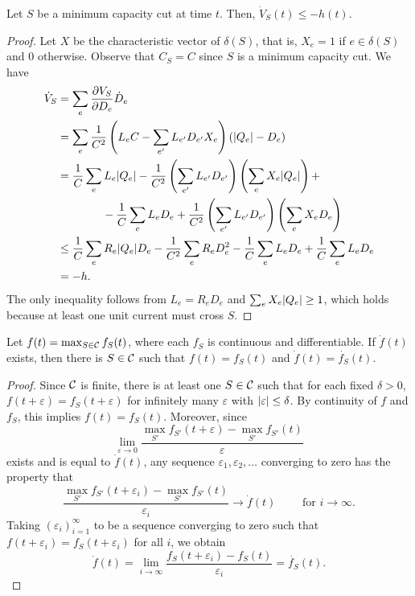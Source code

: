 \documentclass[11pt,a4paper]{article}
\begin{document}
\begin{lemma}
\label{lem:equality}
Let $S$ be a minimum capacity cut at time $t$. Then, $\dot{V}_S(t) \le -h(t)$. %
\end{lemma}
\begin{proof}
Let $X$ be the characteristic vector of $\delta(S)$, that is, $X_e = 1$ if $e \in \delta(S)$ and 0 otherwise. Observe that $C_S=C$ since $S$ is a minimum capacity cut.  
We have
\begin{align*}
\dot{V}_S &= \sum_e \frac{\partial V_S}{\partial D_e} \dot{D}_e \\
&= \sum_e \frac{1}{C^2} \left( L_e C - \sum_{e'} L_{e'} D_{e'} X_e \right)
\left( | Q_e | - D_e \right) \\
&= \frac{1}{C} \sum_e L_e | Q_e | - \frac{1}{C^2} \left(\sum_{e'} L_{e'} D_{e'}
\right) \left(\sum_e X_e | Q_e | \right) + \\
& \qquad\qquad
- \frac{1}{C} \sum_e L_e D_e  + \frac{1}{C^2} \left(\sum_{e'} L_{e'} D_{e'} \right)
\left(\sum_e X_e D_e \right) \\
&\le \frac{1}{C} \sum_e R_e | Q_e | D_e  - \frac{1}{C^2} \sum_{e} R_{e} D_{e}^2
- \frac{1}{C} \sum_e L_e D_e  + \frac{1}{C} \sum_{e} L_{e} D_{e}  \\
&= -h. 
\end{align*}
The only inequality follows from $L_e=R_e D_e$ and $\sum_e X_e | Q_e | \ge
1$, which holds because at least one unit current must cross $S$.   
\end{proof}

\begin{lemma}
\label{lem:max-rule}
Let $f(t) = \max_{S \in {\cal C}} f_S(t)$, where each $f_S$ is continuous and  differentiable. If $\dot{f}(t)$ exists, then there is $S \in {\cal C}$ such that $f(t)=f_S(t)$ and $\dot{f}(t)=\dot{f_S}(t)$. 
\end{lemma}
\begin{proof}
Since ${\cal C}$ is finite, there is at least one $S \in {\cal C}$ such that for each
fixed $\delta>0$, $f(t+\varepsilon)=f_S(t+\varepsilon)$ for infinitely many
$\varepsilon$ with $| \varepsilon | \le \delta$. By continuity of $f$ and
$f_S$, this implies $f(t)=f_S(t)$. Moreover, since 
$$ \lim_{\varepsilon \to 0} \frac{\max_{S'} f_{S'}(t+\varepsilon) - \max_{S'} f_{S'}(t)}{\varepsilon} $$
exists and is equal to $\dot{f}(t)$, any sequence $\varepsilon_1,\varepsilon_2,\dots$ converging to zero has the property that 
$$\frac{\max_{S'} f_{S'}(t+\varepsilon_i) - \max_{S'} f_{S'}(t)}{\varepsilon_i} \to \dot{f}(t) \qquad \text{ for } i \to \infty. $$
Taking $(\varepsilon_i)_{i=1}^{\infty}$ to be a sequence converging to zero such that $f(t+\varepsilon_i)=f_S(t+\varepsilon_i)$ for all $i$, we obtain 
$$ \dot{f}(t) = \lim_{i \to \infty} \frac{f_S(t+\varepsilon_i) - f_S(t)}{\varepsilon_i} = \dot{f_S}(t). $$
\Lnegskip\end{proof}
\end{document}
